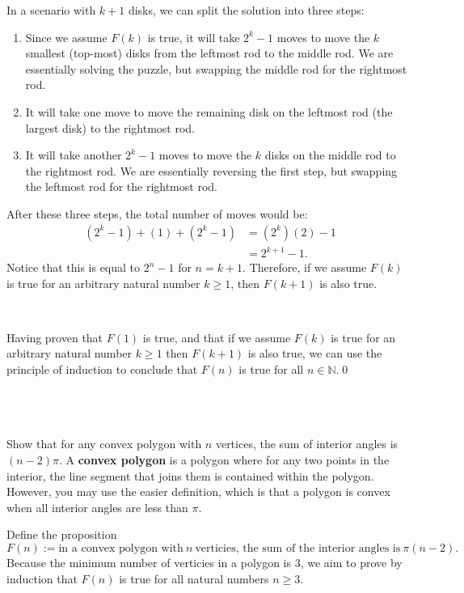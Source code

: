 \documentclass{article}
\begin{document}
In a scenario with $k+1$ disks, we can split the solution into three steps:
\begin{enumerate}
\item Since we assume $F( k)$ is true, it will take $2^{k} -1$ moves to move the $k$ smallest (top-most) disks from the leftmost rod to the middle rod. We are essentially solving the puzzle, but swapping the middle rod for the rightmost rod.
\item It will take one move to move the remaining disk on the leftmost rod (the largest disk) to the rightmost rod.
\item It will take another $2^{k} -1$ moves to move the $k$ disks on the middle rod to the rightmost rod. We are essentially reversing the first step, but swapping the leftmost rod for the rightmost rod.
\end{enumerate}

After these three steps, the total number of moves would be:
\begin{align*}
\left( 2^{k} -1\right) +( 1) +\left( 2^{k} -1\right) & =\left( 2^{k}\right)( 2) -1\\
 & =2^{k+1} -1.
\end{align*}
Notice that this is equal to $2^{n} -1$ for $n=k+1$. Therefore, if we assume $F(k)$ is true for an arbitrary natural number $k\geq 1$, then $F(k+1)$ is also true.

\

Having proven that $F(1)$ is true, and that if we assume $F(k)$ is true for an arbitrary natural number $k\geq 1$ then $F(k+1)$ is also true, we can use the principle of induction to conclude that $F(n)$ is true for all $n\in \mathbb{N}$.\qed 

\
\hline
\section{}

\begin{problem*}
    Show that for any convex polygon with $n$ vertices, the sum of interior angles is $(n-2)\pi$. A \textbf{convex polygon} is a polygon where for any two points in the interior, the line segment that joins them is contained within the polygon. However, you may use the easier definition, which is that a polygon is convex when all interior angles are less than $\pi$.
\end{problem*}

Define the proposition
\begin{equation*}
F( n) :=\text{in a convex polygon with} \ n\ \text{verticies, the sum of the interior angles is} \ \pi ( n-2) .
\end{equation*}
Because the minimum number of verticies in a polygon is $3$, we aim to prove by induction that $F(n)$ is true for all natural numbers $n \geq 3$.
\end{document}
